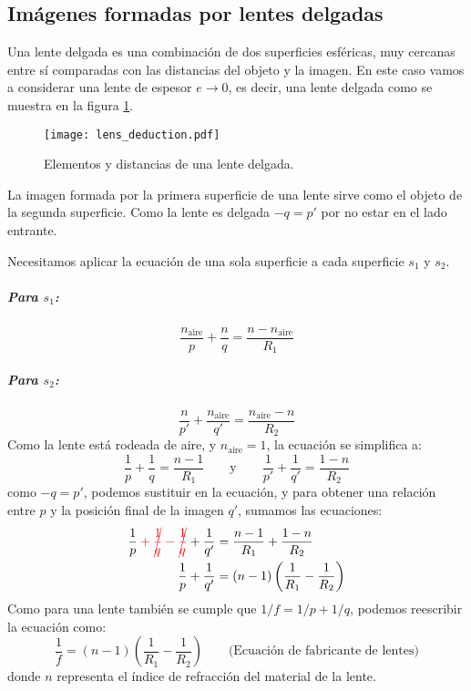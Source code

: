 \subsection{Imágenes formadas por lentes delgadas}

Una lente delgada es una combinación de dos superficies esféricas, muy cercanas entre sí comparadas con las distancias del objeto y la imagen. En este caso vamos a considerar una lente de espesor \(e \to 0\), es decir, una lente delgada como se muestra en la figura \ref{fig:lens_deduction}.
\begin{figure}[ht]
  \centering
  \texttt{[image: lens\_deduction.pdf]}
  \caption{Elementos y distancias de una lente delgada.}
  \label{fig:lens_deduction}
\end{figure}

La imagen formada por la primera superficie de una lente sirve como el objeto de la segunda superficie. Como la lente es delgada \(-q=p'\) por no estar en el lado entrante. 

Necesitamos aplicar la ecuación de una sola superficie a cada superficie \(s_1\) y \(s_2\).

\subparagraph{Para \(s_1\):}

\begin{equation*}
  \frac{n_\text{aire}}{p} + \frac{n}{q} = \frac{n - n_\text{aire}}{R_1}
\end{equation*}

\subparagraph{Para \(s_2\):}

\begin{equation*}
  \frac{n}{p'} + \frac{n_\text{aire}}{q'} = \frac{n_\text{aire} - n}{R_2}
\end{equation*}
Como la lente está rodeada de aire, y \(n_\text{aire} = 1\), la ecuación se simplifica a:
\begin{equation*}
  \frac{1}{p} + \frac{1}{q} = \frac{n-1}{R_1} \qquad \text{y} \qquad \frac{1}{p'} + \frac{1}{q'} = \frac{1 - n}{R_2}
\end{equation*}
como \(-q=p'\), podemos sustituir en la ecuación, y para obtener una relación entre \(p\) y la posición final de la imagen \(q'\), sumamos las ecuaciones:
\begin{align*}
  \frac{1}{p} \color{red}+\cancel{\frac{1}{q}} - \cancel{\frac{1}{q}}\color{black} + \frac{1}{q'} &= \frac{n-1}{R_1} + \frac{1-n}{R_2} \\
  \frac{1}{p} + \frac{1}{q'} &= (n - 1) \left( \frac{1}{R_1} - \frac{1}{R_2} \right)
\end{align*}
Como para una lente también se cumple que \(1/f = 1/p + 1/q\), podemos reescribir la ecuación como:
\begin{equation}
  \frac{1}{f} = (n - 1) \left( \frac{1}{R_1} - \frac{1}{R_2} \right) \qquad \text{(Ecuación de fabricante de lentes)}
\end{equation}
donde \(n\) representa el índice de refracción del material de la lente.